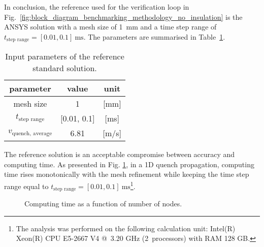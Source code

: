In conclusion, the reference used for the verification loop in Fig.~\ref{fig:block_diagram_benchmarking_methodology_no_insulation} is the ANSYS solution with a mesh size of 1~mm and a time step range of $t_\text{step range}=[0.01, 0.1]~\text{ms}$. The parameters are summarised in Table~\ref{table: 1d_qv_benchmarking_reference_analysis_settings_no_insulation}. 

\begin{table}[H]
    \caption{Input parameters of the reference standard solution.} 
    \vspace{-1.em} 
    \fontsize{10}{10}
    \selectfont 
    \renewcommand{\arraystretch}{1.5}
    \begin{center}
        \begin{tabular}{ ccc }  
        \hline
        parameter & value & unit \\
        \hline
        mesh size & 1 & [mm] \\
        $t_\text{step range}$ & [0.01, 0.1] & [ms] \\
        $v_\text{quench, average}$ & 6.81 & [m/s] \\
        \hline 
        \end{tabular}
    \end{center}  
     \label{table: 1d_qv_benchmarking_reference_analysis_settings_no_insulation} 
 \end{table}

The reference solution is an acceptable compromise between accuracy and computing time. As presented in Fig. \ref{fig: q_vel_modelling_heat_balance_computing_time_no_insulation}, in a 1D quench propagation, computing time rises monotonically with the mesh refinement while keeping the time step range equal to $t_\text{step range}=[0.01, 0.1]~\text{ms}$\footnote{The analysis was performed on the following calculation unit: Intel(R) Xeon(R) CPU E5-2667 V4 @~3.20 GHz (2~processors) with RAM 128 GB.}.

\begin{figure}[H]
\centering
    \caption{Computing time as a function of number of nodes.}
    \label{fig: q_vel_modelling_heat_balance_computing_time_no_insulation}
\end{figure}